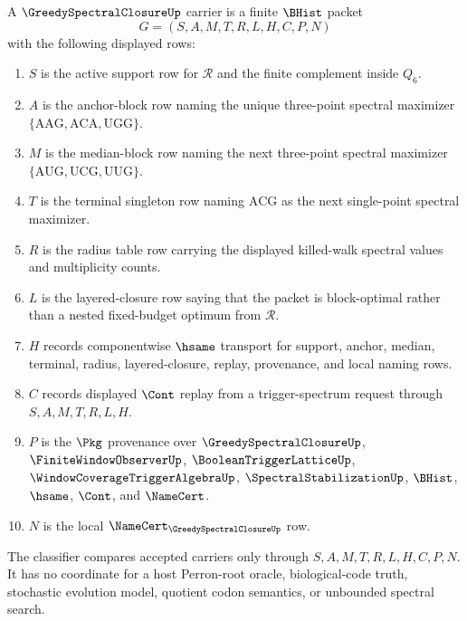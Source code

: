 \begin{definition}
\label{def:greedy-spectral-closure-carrier}
A $\GreedySpectralClosureUp$ carrier is a finite $\BHist$ packet
$$
G=(S,A,M,T,R,L,H,C,P,N)
$$
with the following displayed rows:
\begin{enumerate}
\item $S$ is the active support row for $\mathcal{R}$ and the finite complement inside $Q_6$.
\item $A$ is the anchor-block row naming the unique three-point spectral maximizer $\{\mathrm{AAG},\mathrm{ACA},\mathrm{UGG}\}$.
\item $M$ is the median-block row naming the next three-point spectral maximizer $\{\mathrm{AUG},\mathrm{UCG},\mathrm{UUG}\}$.
\item $T$ is the terminal singleton row naming $\mathrm{ACG}$ as the next single-point spectral maximizer.
\item $R$ is the radius table row carrying the displayed killed-walk spectral values and multiplicity counts.
\item $L$ is the layered-closure row saying that the packet is block-optimal rather than a nested fixed-budget optimum from $\mathcal{R}$.
\item $H$ records componentwise $\hsame$ transport for support, anchor, median, terminal, radius, layered-closure, replay, provenance, and local naming rows.
\item $C$ records displayed $\Cont$ replay from a trigger-spectrum request through $S,A,M,T,R,L,H$.
\item $P$ is the $\Pkg$ provenance over $\GreedySpectralClosureUp$, $\FiniteWindowObserverUp$, $\BooleanTriggerLatticeUp$, $\WindowCoverageTriggerAlgebraUp$, $\SpectralStabilizationUp$, $\BHist$, $\hsame$, $\Cont$, and $\NameCert$.
\item $N$ is the local $\NameCert_{\GreedySpectralClosureUp}$ row.
\end{enumerate}
The classifier compares accepted carriers only through $S,A,M,T,R,L,H,C,P,N$. It has no coordinate for a host Perron-root oracle, biological-code truth, stochastic evolution model, quotient codon semantics, or unbounded spectral search.
\end{definition}

